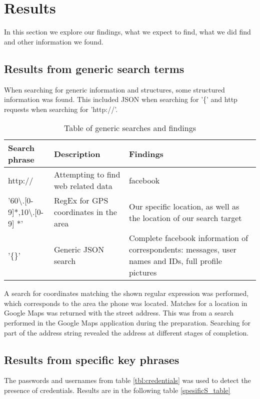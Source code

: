 \section{Results}
In this section we explore our findings, what we expect to find, what we did find and other information we found. 

\subsection{Results from generic search terms}
When searching for generic information and structures, some structured information was found. This included JSON when searching for '\{' and http requests when searching for 'http://'.

\begin{table}[h]
\centering
\label{genericS_table}
\begin{tabular}{|m{2.5cm}|m{2cm}|m{2.5cm}|}
\hline
Search phrase & Description & Findings \\
\hline
http:// & Attempting to find web related data  & facebook \\
\hline
'60\textbackslash.[0-9]*,10\textbackslash.[0-9] *' &  RegEx for GPS coordinates in the area & Our specific location, as well as the location of our search target \\
\hline
'\{\}' & Generic JSON search & Complete facebook information of correspondents: messages, user names and IDs, full profile pictures\\
\hline    
\end{tabular}
\caption{Table of generic searches and findings}
\end{table}

A search for coordinates matching the shown regular expression was performed, which corresponds to the area the phone was located. Matches for a location in Google Maps was returned with the street address. This was from a search performed in the Google Maps application during the preparation. Searching for part of the address string revealed the address at different stages of completion.


\subsection{Results from specific key phrases}
The passwords and usernames from table \ref{tbl:credentials} was used to detect the presence of credentials. Results are in the following table \ref{spesificS_table} %




